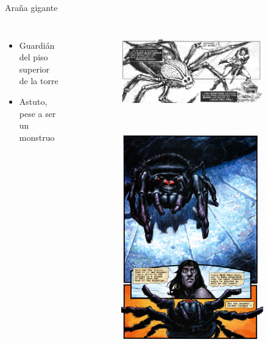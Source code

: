 \begin{frame}{Araña gigante}
\begin{columns}
\begin{itemize}
 \item Guardián del piso superior de la torre
 \item Astuto, pese a ser un monstruo
\end{itemize}
\begin{figure}[htp]
 \centering
 \begin{subfigure}[b]{0.5\textwidth}
   \includegraphics[width=\textwidth]{img/arana/TSSC}
 \end{subfigure}
\\
 \begin{subfigure}[b]{0.3\textwidth}
   \includegraphics[width=\textwidth]{img/arana/DH}

\end{subfigure}
\end{figure}
\end{columns}
\end{frame}
